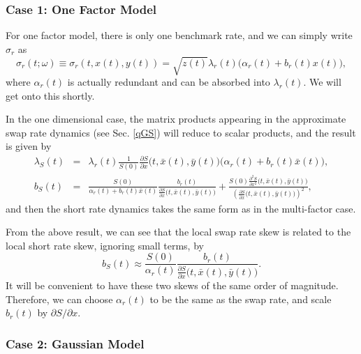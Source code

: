 \documentclass[12pt]{article}
\begin{document}
    \subsubsection{Case 1: One Factor Model}

      For one factor model, there is only one benchmark rate, and we can simply write $\sigma_r$ as
      \begin{equation}
        \sigma_r(t;\omega)\equiv \sigma_r(t,x(t), y(t))=\sqrt{z(t)}\lambda_r(t)\big(\alpha_r(t)+b_r(t)x(t)\big),
      \end{equation}
      where $\alpha_r(t)$ is actually redundant and can be absorbed into $\lambda_r(t)$. We will get onto this shortly.

      In the one dimensional case, the matrix products appearing in the approximate swap rate dynamics (see Sec. \ref{qGS})
      will reduce to scalar products, and the result is given by
      \begin{eqnarray}
        \lambda_S(t)&=&\lambda_r(t)\frac{1}{S(0)}\frac{\partial S}{\partial x}\Big(t, \bar{x}(t),\bar{y}(t)\Big)\Big(\alpha_r(t)+b_r(t)\bar{x}(t)\Big),\\
        b_S(t)&=&\frac{S(0)}{\alpha_r(t)+b_r(t)\bar{x}(t)}\frac{b_r(t)}{\displaystyle \frac{\partial S}{\partial x}\Big(t, \bar{x}(t),\bar{y}(t)\Big)}
                +\frac{\displaystyle S(0)\frac{\partial^2 S}{\partial x^2}\Big(t, \bar{x}(t),\bar{y}(t)\Big)}
                {\displaystyle \left(\frac{\partial S}{\partial x}\Big(t, \bar{x}(t),\bar{y}(t)\Big)\right)^2},
      \end{eqnarray}
      and then the short rate dynamics takes the same form as in the multi-factor case.

      From the above result, we can see that the local swap rate skew is related to the local short rate skew, ignoring small terms, by
      \begin{equation}
        b_S(t)\approx\frac{S(0)}{\alpha_r(t)}\frac{b_r(t)}{\displaystyle\frac{\partial S}{\partial x}\Big(t, \bar{x}(t),\bar{y}(t)\Big)}.
      \end{equation}
      It will be convenient to have these two skews of the same order of magnitude. Therefore, we can choose $\alpha_r(t)$ to be the same as the swap rate,
      and scale $b_r(t)$ by $\partial S/\partial x$.

    \subsubsection{Case 2: Gaussian Model}
\end{document}
